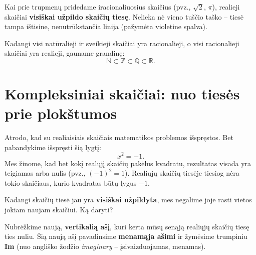 \documentclass[11pt,a4paper]{scrartcl}
\begin{document}
Kai prie trupmenų pridedame iracionaliuosius skaičius (pvz., $\sqrt{2}$, $\pi$), realieji skaičiai \textbf{visiškai užpildo skaičių tiesę}. Nelieka nė vieno tuščio taško -- tiesė tampa ištisine, nenutrūkstančia linija (pažymėta violetine spalva).

Kadangi visi natūralieji ir sveikieji skaičiai yra racionalieji, o visi racionalieji skaičiai yra realieji, gauname grandinę:
\[ \mathbb{N} \subset \mathbb{Z} \subset \mathbb{Q} \subset \mathbb{R}. \]

\begin{center}
\end{center}


\section{Kompleksiniai skaičiai: nuo tiesės prie plokštumos}

Atrodo, kad su realiaisiais skaičiais matematikos problemos išspręstos. Bet pabandykime išspręsti šią lygtį:
\[ x^2 = -1. \]
Mes žinome, kad bet kokį realųjį skaičių pakėlus kvadratu, rezultatas visada yra teigiamas arba nulis (pvz., $(-1)^2 = 1$). Realiųjų skaičių tiesėje tiesiog nėra tokio skaičiaus, kurio kvadratas būtų lygus $-1$. 

Kadangi skaičių tiesė jau yra \textbf{visiškai užpildyta}, mes negalime joje rasti vietos jokiam naujam skaičiui. Ką daryti? 

Nubrėžkime naują, \textbf{vertikalią ašį}, kuri kerta mūsų senąją realiųjų skaičių tiesę ties nuliu. Šią naują ašį pavadinsime \textbf{menamąja ašimi} ir žymėsime trumpiniu \textbf{Im} (nuo angliško žodžio \textit{imaginary} -- įsivaizduojamas, menamas).

\begin{center}
\end{center}
\end{document}
